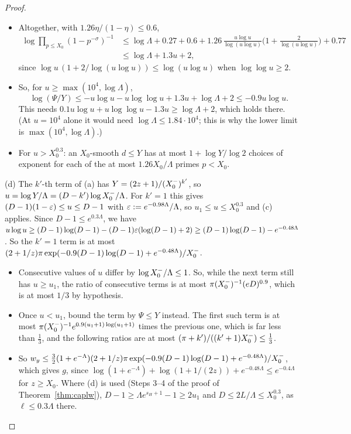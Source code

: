 \begin{proof}
\begin{itemize}
  $\mathrm{Ei}(x)\le(e^x/x)(1+1/x+2.75/x^2)+134$, and $2.75/x+134x^2e^{-x}\le1$ there.
\item Altogether, with $1.26\eta/(1-\eta)\le0.6$,
  \begin{align*}
  \log\prod_{p\le X_0}(1-p^{-\sigma})^{-1}&\le\log\Lambda+0.27+0.6+1.26\,\frac{u\log u}{\log(u\log u)}\Big(1+\frac2{\log(u\log u)}\Big)+0.77\\
  &\le\log\Lambda+1.3u+2,
  \end{align*}
  since $\log u\,(1+2/\log(u\log u))\le\log(u\log u)$ when $\log\log u\ge2$.
\item So, for $u\ge\max(10^4,\log\Lambda)$,
  \[
  \log(\Psi/Y)\le-u\log u-u\log\log u+1.3u+\log\Lambda+2\le-0.9u\log u.
  \]
  This needs
  $0.1u\log u+u\log\log u-1.3u\ge\log\Lambda+2$, which holds there. (At $u=10^4$ alone it would need
  $\log\Lambda\le1.84\cdot10^4$; this is why the lower limit is $\max(10^4,\log\Lambda)$.)
\item For $u>X_0^{0.3}$: an $X_0$-smooth $d\le Y$ has at most $1+\log Y/\log2$ choices of exponent for each of the at most
  $1.26X_0/\Lambda$ primes $p<X_0$.
\end{itemize}

(d) The $k'$-th term of (a) has $Y=(2z+1)/(X_0^{-})^{k'}$, so $u=\log Y/\Lambda=(D-k')\log X_0^{-}/\Lambda$. For $k'=1$ this gives
$(D-1)(1-\varepsilon)\le u\le D-1$ with $\varepsilon:=e^{-0.98\Lambda}/\Lambda$, so $u_1\le u\le X_0^{0.3}$ and (c) applies. Since
$D-1\le e^{0.3\Lambda}$, we have $u\log u\ge(D-1)\log(D-1)-(D-1)\varepsilon(\log(D-1)+2)\ge(D-1)\log(D-1)-e^{-0.48\Lambda}$. So the
$k'=1$ term is at most $(2+1/z)\pi\exp(-0.9(D-1)\log(D-1)+e^{-0.48\Lambda})/X_0^{-}$.
\begin{itemize}
\item Consecutive values of $u$ differ by $\log X_0^{-}/\Lambda\le1$. So, while the next term still has $u\ge u_1$, the ratio
  of consecutive terms is at most $\pi(X_0^{-})^{-1}(eD)^{0.9}$, which is at most $1/3$ by hypothesis.
\item Once $u<u_1$, bound the term by $\Psi\le Y$ instead. The first such term is at most
  $\pi(X_0^{-})^{-1}e^{0.9(u_1+1)\log(u_1+1)}$ times the previous one, which is far less than $\tfrac13$, and the
  following ratios are at most $(\pi+k')/((k'+1)X_0^{-})\le\tfrac13$.
\item So $w_y\le\tfrac32(1+e^{-\Lambda})(2+1/z)\pi\exp(-0.9(D-1)\log(D-1)+e^{-0.48\Lambda})/X_0^{-}$, which gives $g$, since
  $\log(1+e^{-\Lambda})+\log(1+1/(2z))+e^{-0.48\Lambda}\le e^{-0.4\Lambda}$ for $z\ge X_0$. Where (d)
  is used (Steps 3--4 of the proof of Theorem~\ref{thm:caplw}), $D-1\ge\Lambda e^{s_H+1}-1\ge2u_1$ and $D\le2L/\Lambda\le
  X_0^{0.3}$, as $\ell\le0.3\Lambda$ there.
\end{itemize}


\end{proof}
